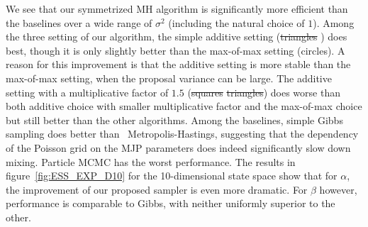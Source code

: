 We see that our symmetrized MH algorithm is significantly more efficient than the baselines over a wide range of $\sigma^2$ (including the natural choice of $1$).
Among the three setting of our algorithm, the simple additive setting
 (\sout{triangles} ) does best, though it is only slightly better than 
 the {max-of-max} setting (circles). 
A reason for this improvement is that the additive setting is more stable than the max-of-max setting, when the proposal variance can be large. 
The {additive setting with a multiplicative factor of $1.5$} (\sout{squares} \sout{triangles}) does worse than both {additive choice with smaller multiplicative factor and the max-of-max choice} but still better than the other algorithms. 
Among the baselines, simple Gibbs sampling does better than \naive\ Metropolis-Hastings, suggesting that the dependency of the Poisson grid on the MJP parameters does indeed significantly slow down mixing. 
Particle MCMC has the worst performance. 
The results in figure~\ref{fig:ESS_EXP_D10} for the 10-dimensional state space show that for $\alpha$, the improvement of our proposed sampler is even more dramatic. 
   For $\beta$ however, performance is comparable to Gibbs, %
   with neither uniformly superior to the other.
